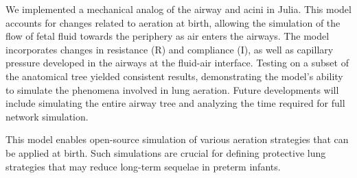 We implemented a mechanical analog of the airway and acini in
Julia. This model accounts for changes related to aeration at birth,
allowing the simulation of the flow of fetal fluid towards the
periphery as air enters the airways. The model incorporates changes in
resistance (R) and compliance (I), as well as capillary pressure
developed in the airways at the fluid-air interface. Testing on a
subset of the anatomical tree yielded consistent results,
demonstrating the model's ability to simulate the phenomena involved
in lung aeration. Future developments will include simulating the
entire airway tree and analyzing the time required for full network
simulation.

This model enables open-source simulation of various aeration
strategies that can be applied at birth. Such simulations are crucial
for defining protective lung strategies that may reduce long-term
sequelae in preterm infants.


